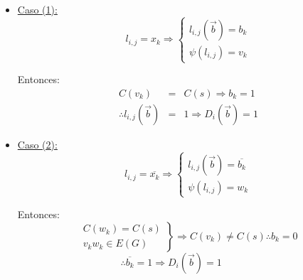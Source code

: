\documentclass[12pt,a4paper]{report}
\newcounter{neq}
\begin{document}
				\begin{itemize}
					\item \underline{Caso (1):}
						\begin{equation*}
							l_{i, j} = x_{k} \Rightarrow
		  					\left\lbrace
							\begin{array}{l}
	  		 					l_{i, j}(\overrightarrow{b}) = b_{k} \\
								\psi(l_{i, j}) = v_{k}
							\end{array}
							\right.
						\end{equation*}
						
						\par Entonces:
						\begin{eqnarray}
							\nonumber C(v_{k}) &=& C(s) \Rightarrow b_{k} = 1 \\
							\nonumber \therefore l_{i, j}(\overrightarrow{b}) &=& 1 \Rightarrow D_{i}(\overrightarrow{b}) = 1
						\end{eqnarray}
					\item \underline{Caso (2):}
						\begin{equation*}
							l_{i, j} = \overline{x_{k}} \Rightarrow
		  					\left\lbrace
							\begin{array}{l}
	  		 					l_{i, j}(\overrightarrow{b}) = 	\overline{b_{k}} \\
								\psi(l_{i, j}) = w_{k}
							\end{array}
							\right.
						\end{equation*}

						\par Entonces:
						\begin{equation*}
		  				\left.
		  				\begin{array}{l}
		    		 		C(w_{k}) = C(s) \\
		    		 		v_{k} w_{k} \in E(G)
		  				\end{array}
		 			 		\right\rbrace
		 			 		\Rightarrow C(v_{k}) \neq C(s) \therefore b_{k} = 0
						\end{equation*}
						$\qquad\qquad\qquad\qquad\qquad$
						$\therefore \overline{b_{k}} = 1 \Rightarrow D_{i}(\overrightarrow{b}) = 1$
				\end{itemize}
\end{document}
